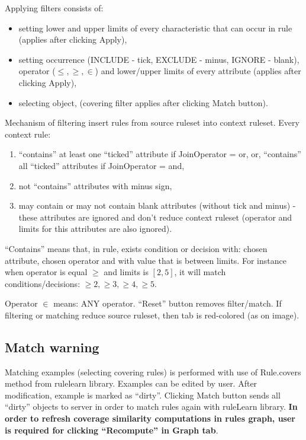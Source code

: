 \documentclass[12pt]{article}
\begin{document}
Applying filters consists of:
\begin{itemize}
    \setlength\itemsep{0em}
    \item setting lower and upper limits of every characteristic that can occur in rule (applies after clicking Apply),
    \item setting occurrence (INCLUDE - tick, EXCLUDE - minus, IGNORE - blank), operator ($\le, \ge, \in$) and lower/upper limits of every attribute (applies after clicking Apply),
    \item selecting object, (covering filter applies after clicking Match button).
\end{itemize}

Mechanism of filtering insert rules from source ruleset into context ruleset. Every context rule:
\begin{enumerate}
    \setlength\itemsep{0em}
    \item ``contains'' at least one ``ticked'' attribute if JoinOperator = or, or, ``contains'' all ``ticked'' attributes if JoinOperator = and,
    \item not ``contains'' attributes with minus sign,
    \item may contain or may not contain blank attributes (without tick and minus) - these attributes are ignored and don't reduce context ruleset (operator and limits for this attributes are also ignored).
\end{enumerate}
``Contains'' means that, in rule, exists condition or decision with: chosen attribute, chosen operator and with value that is between limits. For instance when operator is equal $\ge$ and limits is $[2,5]$, it will match conditions/decisions: $\ge 2, \ge 3, \ge 4, \ge 5$. 

Operator $\in$ means: ANY operator. ``Reset'' button removes filter/match. If filtering or matching reduce source ruleset, then tab is red-colored (as on image).

\subsection{Match warning}\label{match}
Matching examples (selecting covering rules) is performed with use of Rule.covers method from rulelearn library. Examples can be edited by user. After modification, example is marked as ``dirty''. Clicking Match button sends all ``dirty'' objects to server in order to match rules again with ruleLearn library. \textbf{In order to refresh coverage similarity computations in rules graph, user is required for clicking ``Recompute'' in Graph tab}.
\end{document}
